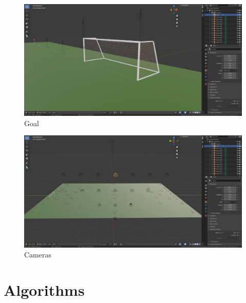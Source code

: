 \documentclass[
    11pt,
    twoside
]{report}
\begin{document}
\begin{appendices}
\begin{figure}[H]
    \includegraphics[keepaspectratio, width=\columnwidth]{Screenshot_2022-03-05_12-47-42.png}
    \caption{Goal}
    \label{img:goal}
\end{figure}

\begin{figure}[H]
    \includegraphics[keepaspectratio, width=\columnwidth]{Screenshot_2022-03-05_12-05-23.png}
    \caption{Cameras}
    \label{img:cameras}
\end{figure}



\section{Algorithms}
\listofalgorithms



\end{appendices}
\end{document}
